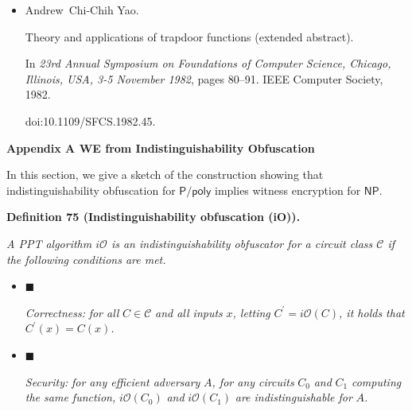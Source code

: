 \documentclass[10pt,a4paper]{article}
\begin{document}
\begin{itemize}
\emph{Commun. ACM}, 27(11):1134–1142, 1984.


doi:10.1145/1968.1972.





\item[] 
[47]

Andrew Chi-Chih Yao.


Theory and applications of trapdoor functions (extended abstract).


In \emph{23rd Annual Symposium on Foundations of Computer Science,
Chicago, Illinois, USA, 3-5 November 1982}, pages 80–91. IEEE Computer
Society, 1982.


doi:10.1109/SFCS.1982.45.





\end{itemize}




\par\medskip\noindent\textbf{
Appendix A WE from Indistinguishability Obfuscation}\par




In this section, we give a sketch of the construction showing that indistinguishability obfuscation for ${\mathsf{P}}/{\mathsf{poly}}$ implies witness encryption for ${\mathsf{NP}}$.\par





\par\medskip\noindent\textbf{
\textbf{Definition 75}\textbf{ }(Indistinguishability obfuscation (iO))\textbf{.}
}\par



\emph{A PPT algorithm $i\mathcal{O}$ is an indistinguishability obfuscator for a circuit class $\mathcal{C}$ if the following conditions are met.}\par


\begin{itemize}


\item[] 
$\blacksquare$ 


\emph{Correctness:}\emph{ for all }$C\in\mathcal{C}$\emph{ and all inputs }$x$\emph{, letting }$C^{\prime}=i\mathcal{O}(C)$\emph{, it holds that }$C^{\prime}(x)=C(x)$\emph{.}\par





\item[] 
$\blacksquare$ 


\emph{Security:}\emph{ for any efficient adversary }$A$\emph{, for any circuits }$C_{0}$\emph{ and }$C_{1}$\emph{ computing the same function, }$i\mathcal{O}(C_{0})$\emph{ and }$i\mathcal{O}(C_{1})$\emph{ are indistinguishable for }$A$\emph{.}\par





\end{itemize}
\end{document}
